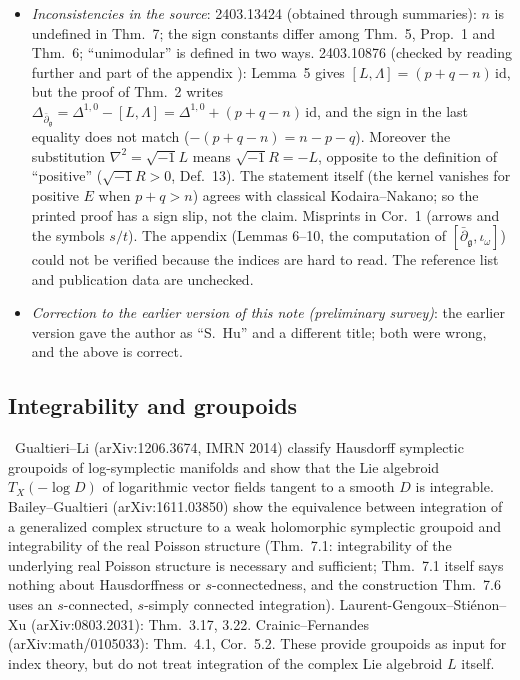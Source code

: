 \begin{itemize}
\item \emph{Inconsistencies in the source}: 2403.13424 (obtained through summaries): $n$ is undefined in Thm.~7; the sign constants differ among Thm.~5, Prop.~1 and Thm.~6; ``unimodular'' is defined in two ways. 2403.10876 (checked by reading further and part of the appendix \tC): Lemma~5 gives $[L,\Lambda]=(p+q-n)\,\mathrm{id}$, but the proof of Thm.~2 writes $\Delta_{\bar\partial_{\mathfrak g}}=\Delta^{1,0}-[L,\Lambda]=\Delta^{1,0}+(p+q-n)\,\mathrm{id}$, and the sign in the last equality does not match ($-(p+q-n)=n-p-q$). Moreover the substitution $\nabla^2=\sqrt{-1}L$ means $\sqrt{-1}R=-L$, opposite to the definition of ``positive'' ($\sqrt{-1}R>0$, Def.~13). The statement itself (the kernel vanishes for positive $E$ when $p+q>n$) agrees with classical Kodaira--Nakano; so the printed proof has a sign slip, not the claim. Misprints in Cor.~1 (arrows and the symbols $s/t$). The appendix (Lemmas 6--10, the computation of $[\bar\partial_{\mathfrak g},\iota_\omega]$) could not be verified because the indices are hard to read. The reference list and publication data are unchecked. \tQ
\item \emph{Correction to the earlier version of this note (preliminary survey)}: the earlier version gave the author as ``S.~Hu'' and a different title; both were wrong, and the above is correct.
\end{itemize}

\subsection{Integrability and groupoids}
\tC\ Gualtieri--Li (arXiv:1206.3674, IMRN 2014) classify Hausdorff symplectic groupoids of log-symplectic manifolds and show that the Lie algebroid $T_X(-\log D)$ of logarithmic vector fields tangent to a smooth $D$ is integrable. Bailey--Gualtieri (arXiv:1611.03850) show the equivalence between integration of a generalized complex structure to a weak holomorphic symplectic groupoid and integrability of the real Poisson structure (Thm.~7.1: integrability of the underlying real Poisson structure is necessary and sufficient; Thm.~7.1 itself says nothing about Hausdorffness or $s$-connectedness, and the construction Thm.~7.6 uses an $s$-connected, $s$-simply connected integration). Laurent-Gengoux--Sti\'enon--Xu (arXiv:0803.2031): Thm.~3.17, 3.22. Crainic--Fernandes (arXiv:math/0105033): Thm.~4.1, Cor.~5.2. These provide groupoids as input for index theory, but do not treat integration of the complex Lie algebroid $L$ itself.

